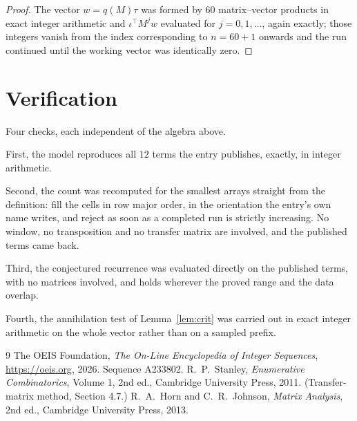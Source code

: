 \documentclass[11pt,a4paper]{article}
\theoremstyle{plain}
\theoremstyle{definition}
\begin{document}
\begin{proof}
The vector $w=q(M)\tau$ was formed by $60$ matrix--vector products in exact integer
arithmetic and $\iota^{\!\top}M^{j}w$ evaluated for $j=0,1,\dots$, again exactly; those
integers vanish from the index corresponding to $n=60+1$ onwards and the run continued
until the working vector was identically zero.
\end{proof}

\section{Verification}

Four checks, each independent of the algebra above.

First, the model reproduces all $12$ terms the entry publishes, exactly, in integer
arithmetic.

Second, the count was recomputed for the smallest arrays straight from the definition: fill the
cells in row major order, in the orientation the entry's own name writes, and reject as soon as
a completed run is strictly increasing. No window, no transposition and no transfer matrix are involved, and
the published terms came back.

Third, the conjectured recurrence was evaluated directly on the published terms, with no
matrices involved, and holds wherever the proved range and the data overlap.

Fourth, the annihilation test of Lemma~\ref{lem:crit} was carried out in exact integer
arithmetic on the whole vector rather than on a sampled prefix.

\begin{thebibliography}{9}
 The OEIS Foundation, \emph{The On-Line Encyclopedia of Integer
Sequences}, \url{https://oeis.org}, 2026. Sequence A233802.
 R.~P.~Stanley, \emph{Enumerative Combinatorics}, Volume 1, 2nd ed.,
Cambridge University Press, 2011. (Transfer-matrix method, Section 4.7.)
 R.~A.~Horn and C.~R.~Johnson, \emph{Matrix Analysis}, 2nd ed., Cambridge
University Press, 2013.
\end{thebibliography}
\end{document}
